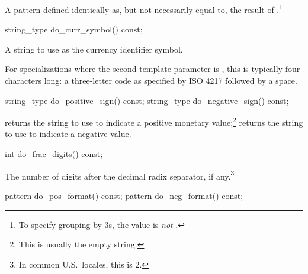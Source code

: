 \begin{itemdescr}
\pnum
\returns
A pattern defined identically as, but not necessarily equal to, the result of
.\footnote{To specify grouping by 3s,
the value is 
\textit{not}
.}
\end{itemdescr}

%
\begin{itemdecl}
string_type do_curr_symbol() const;
\end{itemdecl}

\begin{itemdescr}
\pnum
\returns
A string to use as the currency identifier symbol.
\begin{note}
For specializations where the second template parameter is ,
this is typically four characters long: a three-letter code as specified
by ISO 4217 followed by a space.
\end{note}
\end{itemdescr}

%
%
\begin{itemdecl}
string_type do_positive_sign() const;
string_type do_negative_sign() const;
\end{itemdecl}

\begin{itemdescr}
\pnum
\returns
{}
returns the string to use to indicate a
positive monetary value;\footnote{This is usually the empty string.}
returns the string to use to indicate a negative value.
\end{itemdescr}

%
\begin{itemdecl}
int do_frac_digits() const;
\end{itemdecl}

\begin{itemdescr}
\pnum
\returns
The number of digits after the decimal radix separator, if any.\footnote{In
common U.S.\ locales, this is 2.}
\end{itemdescr}

%
%
\begin{itemdecl}
pattern do_pos_format() const;
pattern do_neg_format() const;
\end{itemdecl}

